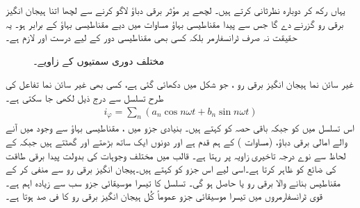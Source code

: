 یہاں رکھ کر دوبارہ نظرثانی کرتے ہیں۔   لچھے پر  مؤثر برقی دباؤ لاگو کرنے سے  لچھا اتنا ہیجان انگیز برقی رو  گزرنے دے گا  جس سے پیدا   مقناطیسی بہاؤ مساوات   میں دیے  مقناطیسی بہاؤ  کے برابر ہو۔ یہ حقیقت  نہ صرف ٹرانسفارمر بلکہ کسی بھی مقناطیسی دور کے لیے درست اور لازم ہے۔
\begin{figure}
\centering
\caption{مختلف دوری سمتیوں کے زاویے۔}
\label{شکل_ٹرانسفارمر_مرکزی_ضیاع_اور_مقناطیسی_رو}
\end{figure}

غیر سائن نما ہیجان انگیز برقی رو ، جو شکل  میں دکھائی گئی ہے،   کسی بھی غیر سائن نما تفاعل کی طرح   تسلسل سے درج ذیل لکھی جا سکتی ہے۔
\begin{align} \label{مساوات_ٹرانسفارمر_فوریئر_تسلسل_رو}
i_{\varphi}=\sum_n {\left( a_n \cos n \omega t + b_n \sin n\omega t \right)}
\end{align}
اس تسلسل میں  کو   جبکہ باقی حصہ کو    کہتے ہیں۔ بنیادی جزو میں ، مقناطیسی بہاؤ سے وجود میں آنے والے امالی برقی دباؤ،   (مساوات )  کے ہم قدم ہے اور  دونوں ایک ساتھ بڑھتے اور گھٹتے ہیں جبکہ   کے لحاظ سے  نوے درجہ تاخیری  زاویہ  پر رہتا ہے۔ قالب میں مختلف وجوہات کی بدولت پیدا برقی طاقت کی ضائع  کو  ظاہر  کرتا ہے۔اسی لیے اس جزو کو   کہتے ہیں۔ہیجان انگیز برقی رو  سے  منفی کر کے مقناطیس بنانے والا برقی رو یا
 حاصل ہو گی۔ تسلسل  کا تیسرا موسیقائی جزو سب سے زیادہ اہم  ہے۔ قوی  ٹرانسفارمروں میں  تیسرا موسیقائی جزو عموماً  کُل ہیجان انگیز برقی رو  کا  فی صد ہوتا ہے۔  

